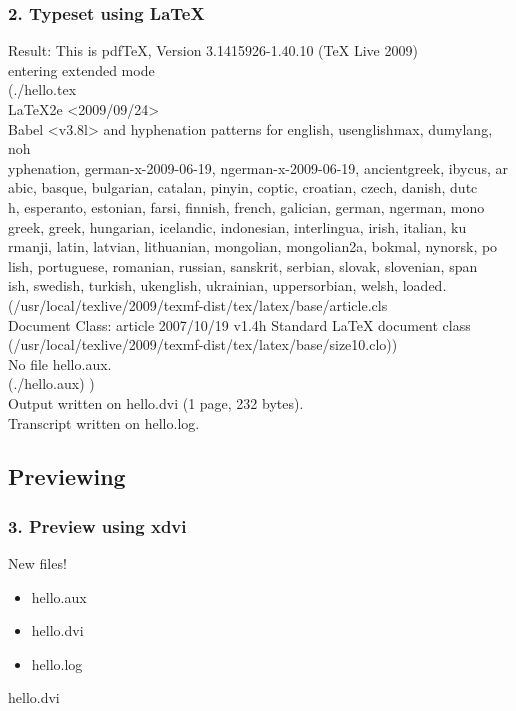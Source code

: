 \documentclass[ignorenonframetext]{beamer}
\begin{document}
\begin{frame}
  \frametitle{2. Typeset using \LaTeX}
  \begin{block}{Result:}{\ttfamily\scriptsize
    This is pdfTeX, Version 3.1415926-1.40.10 (TeX Live 2009)\\
    entering extended mode\\
    (./hello.tex\\
    LaTeX2e <2009/09/24>\\
    Babel <v3.8l> and hyphenation patterns for english, usenglishmax, dumylang, noh\\
    yphenation, german-x-2009-06-19, ngerman-x-2009-06-19, ancientgreek, ibycus, ar\\
    abic, basque, bulgarian, catalan, pinyin, coptic, croatian, czech, danish, dutc\\
    h, esperanto, estonian, farsi, finnish, french, galician, german, ngerman, mono\\
    greek, greek, hungarian, icelandic, indonesian, interlingua, irish, italian, ku\\
    rmanji, latin, latvian, lithuanian, mongolian, mongolian2a, bokmal, nynorsk, po\\
    lish, portuguese, romanian, russian, sanskrit, serbian, slovak, slovenian, span\\
    ish, swedish, turkish, ukenglish, ukrainian, uppersorbian, welsh, loaded.\\
    (/usr/local/texlive/2009/texmf-dist/tex/latex/base/article.cls\\
    Document Class: article 2007/10/19 v1.4h Standard LaTeX document class\\
    (/usr/local/texlive/2009/texmf-dist/tex/latex/base/size10.clo))\\
    No file hello.aux.\\
    [1] (./hello.aux) )\\
    Output written on hello.dvi (1 page, 232 bytes).\\
    Transcript written on hello.log.}
  \end{block}
\end{frame}

\subsection{Previewing}
\begin{frame}
  \frametitle{3. Preview using xdvi}
  \begin{block}{New files!}
    \begin{itemize}
    \item hello.aux
    \item hello.dvi
    \item hello.log
    \end{itemize}
  \end{block}
  \begin{block}{hello.dvi}
    
  \end{block}
\end{frame}
\end{document}
